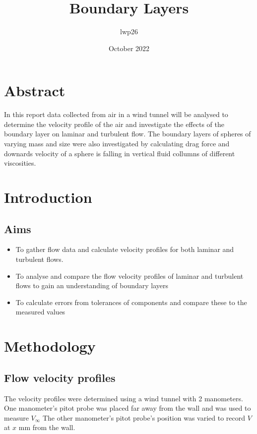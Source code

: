\documentclass{article}
\begin{document}
\title{Boundary Layers}
\author{lwp26 }
\date{October 2022}
\maketitle

\section{Abstract}
In this report data collected from air in a wind tunnel will be analysed to determine the
velocity profile of the air and investigate the effects of the boundary layer on laminar and turbulent flow.
The boundary layers of spheres of varying mass and size were also investigated by calculating drag force and downards velocity
of a sphere is falling in vertical fluid collumns of different viscosities.

\section{Introduction}


\subsection{Aims}

\begin{itemize}
\item To gather flow data and calculate velocity profiles for both laminar and turbulent flows.
\item To analyse and compare the flow velocity profiles of laminar and turbulent flows to gain an understanding of boundary layers
\item To calculate errors from tolerances of components and compare these to the measured values
\end{itemize}

\section{Methodology}

\subsection{Flow velocity profiles}
The velocity profiles were determined using a wind tunnel with 2 manometers. One manometer's pitot probe was placed far away from the wall and was used to measure $V_\infty$ The other manometer's pitot probe's position was varied to record $V$ at $x$ mm from the wall.
\end{document}
